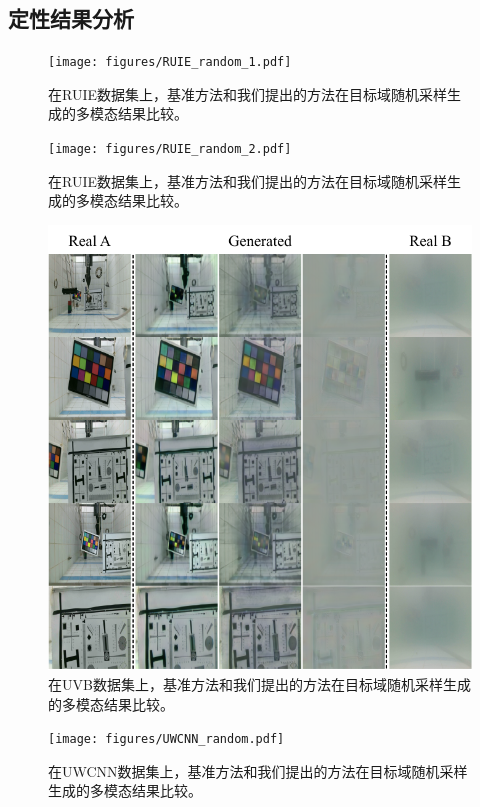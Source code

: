 \subsection{定性结果分析}

\begin{figure}[htp]
    \centering
	\texttt{[image: figures/RUIE\_random\_1.pdf]}
	\caption{在RUIE数据集上，基准方法和我们提出的方法在目标域随机采样生成的多模态结果比较。}
	\label{fig:ruie_random_1}
\end{figure}

\begin{figure}[htp]
    \centering
	\texttt{[image: figures/RUIE\_random\_2.pdf]}
	\caption{在RUIE数据集上，基准方法和我们提出的方法在目标域随机采样生成的多模态结果比较。}
	\label{fig:ruie_random_2}
\end{figure}

\begin{figure}[htp]
    \centering
	\includegraphics[width=\textwidth]{figures/UVB_random.pdf}
	\caption{在UVB数据集上，基准方法和我们提出的方法在目标域随机采样生成的多模态结果比较。}
	\label{fig:uvb_random}
\end{figure}

\begin{figure}[htp]
    \centering
	\texttt{[image: figures/UWCNN\_random.pdf]}
	\caption{在UWCNN数据集上，基准方法和我们提出的方法在目标域随机采样生成的多模态结果比较。}
	\label{fig:uwcnn_random}
\end{figure}

